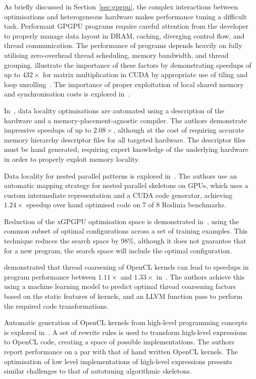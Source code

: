 As briefly discussed in Section~\ref{sec:gpgpu}, the complex
interactions between optimisations and heterogeneous hardware makes
performance tuning a difficult task. Performant GPGPU programs require
careful attention from the developer to properly manage data layout in
DRAM, caching, diverging control flow, and thread communication. The
performance of programs depends heavily on fully utilising
zero-overhead thread scheduling, memory bandwidth, and thread
grouping. \citeauthor{Ryoo2008a} illustrate the importance of these
factors by demonstrating speedups of up to $432\times$ for matrix
multiplication in CUDA by appropriate use of tiling and loop
unrolling~\cite{Ryoo2008a}. The importance of proper exploitation of
local shared memory and synchronisation costs is explored
in~\cite{Lee2010}.

In~\cite{Chen2014}, data locality optimisations are automated using a
description of the hardware and a memory-placement-agnostic
compiler. The authors demonstrate impressive speedups of up to
$2.08\times$, although at the cost of requiring accurate memory
hierarchy descriptor files for all targeted hardware. The descriptor
files must be hand generated, requiring expert knowledge of the
underlying hardware in order to properly exploit memory locality.

Data locality for nested parallel patterns is explored in~\cite{Lee}.
The authors use an automatic mapping strategy for nested parallel
skeletons on GPUs, which uses a custom intermediate representation and
a CUDA code generator, achieving $1.24\times$ speedup over hand
optimised code on 7 of 8 Rodinia benchmarks.

Reduction of the xGPGPU optimisation space is demonstrated
in~\cite{Ryoo2008}, using the common subset of optimal configurations
across a set of training examples. This technique reduces the search
space by 98\%, although it does not guarantee that for a new program,
the search space will include the optimal configuration.

\citeauthor{Magni2014} demonstrated that thread coarsening of OpenCL
kernels can lead to speedups in program performance between
$1.11\times$ and $1.33\times$ in~\cite{Magni2014}. The authors achieve
this using a machine learning model to predict optimal thread
coarsening factors based on the static features of kernels, and an
LLVM function pass to perform the required code transformations.

Automatic generation of OpenCL kernels from high-level programming
concepts is explored in~\cite{Steuwer2015}. A set of rewrite rules is
used to transform high-level expressions to OpenCL code, creating a
space of possible implementations. The authors report performance on a
par with that of hand written OpenCL kernels. The optimisation of low
level implementations of high-level expressions presents similar
challenges to that of autotuning algorithmic skeletons.



